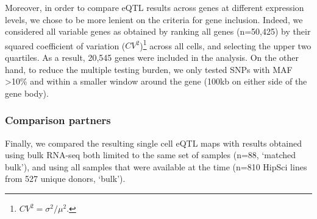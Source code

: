 \newpage

Moreover, in order to compare eQTL results across genes at different expression levels, we chose to be more lenient on the criteria for gene inclusion.
Indeed, we considered all variable genes as obtained by ranking all genes (n=50,425) by their squared coefficient of variation ($CV^2$)\footnote{$CV^2=\sigma^2/\mu^2$.} across all cells, and selecting the upper two quartiles.
As a result, 20,545 genes were included in the analysis. 
On the other hand, to reduce the multiple testing burden, we only tested SNPs with MAF >10\% and within a smaller window around the gene (100kb on either side of the gene body).

\subsubsection{Comparison partners}

Finally, we compared the resulting single cell eQTL maps with results obtained using bulk RNA-seq both limited to the same set of samples (n=88, `matched bulk'), and using all samples that were available at the time (n=810 HipSci lines from 527 unique donors, `bulk'). 




